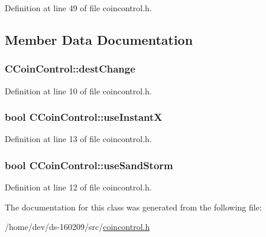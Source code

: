 Definition at line 49 of file coincontrol.\+h.



\subsection{Member Data Documentation}
\hypertarget{class_c_coin_control_aa991ffd830267f6c2103fa7e03213f41}{}
\subsubsection[{dest\+Change}]{ C\+Coin\+Control\+::dest\+Change}\label{class_c_coin_control_aa991ffd830267f6c2103fa7e03213f41}


Definition at line 10 of file coincontrol.\+h.

\hypertarget{class_c_coin_control_a8c5a07b8f3acef82a471a57a7f21e170}{}
\subsubsection[{use\+Instant\+X}]{\setlength{\rightskip}{0pt plus 5cm}bool C\+Coin\+Control\+::use\+Instant\+X}\label{class_c_coin_control_a8c5a07b8f3acef82a471a57a7f21e170}


Definition at line 13 of file coincontrol.\+h.

\hypertarget{class_c_coin_control_aaf970313b382dbd5ac0076c7765949b7}{}
\subsubsection[{use\+Sand\+Storm}]{\setlength{\rightskip}{0pt plus 5cm}bool C\+Coin\+Control\+::use\+Sand\+Storm}\label{class_c_coin_control_aaf970313b382dbd5ac0076c7765949b7}


Definition at line 12 of file coincontrol.\+h.



The documentation for this class was generated from the following file\+:\begin{DoxyCompactItemize}
\item 
/home/dev/ds-\/160209/src/\hyperlink{coincontrol_8h}{coincontrol.\+h}\end{DoxyCompactItemize}
